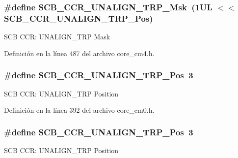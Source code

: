 \subsubsection[{\texorpdfstring{S\+C\+B\+\_\+\+C\+C\+R\+\_\+\+U\+N\+A\+L\+I\+G\+N\+\_\+\+T\+R\+P\+\_\+\+Msk}{SCB_CCR_UNALIGN_TRP_Msk}}]{\setlength{\rightskip}{0pt plus 5cm}\#define S\+C\+B\+\_\+\+C\+C\+R\+\_\+\+U\+N\+A\+L\+I\+G\+N\+\_\+\+T\+R\+P\+\_\+\+Msk~(1\+U\+L $<$$<$ S\+C\+B\+\_\+\+C\+C\+R\+\_\+\+U\+N\+A\+L\+I\+G\+N\+\_\+\+T\+R\+P\+\_\+\+Pos)}\hypertarget{group___c_m_s_i_s___s_c_b_ga68c96ad594af70c007923979085c99e0}{}\label{group___c_m_s_i_s___s_c_b_ga68c96ad594af70c007923979085c99e0}
S\+CB C\+CR\+: U\+N\+A\+L\+I\+G\+N\+\_\+\+T\+RP Mask 

Definición en la línea 487 del archivo core\+\_\+cm4.\+h.

\subsubsection[{\texorpdfstring{S\+C\+B\+\_\+\+C\+C\+R\+\_\+\+U\+N\+A\+L\+I\+G\+N\+\_\+\+T\+R\+P\+\_\+\+Pos}{SCB_CCR_UNALIGN_TRP_Pos}}]{\setlength{\rightskip}{0pt plus 5cm}\#define S\+C\+B\+\_\+\+C\+C\+R\+\_\+\+U\+N\+A\+L\+I\+G\+N\+\_\+\+T\+R\+P\+\_\+\+Pos~3}\hypertarget{group___c_m_s_i_s___s_c_b_gac4e4928b864ea10fc24dbbc57d976229}{}\label{group___c_m_s_i_s___s_c_b_gac4e4928b864ea10fc24dbbc57d976229}
S\+CB C\+CR\+: U\+N\+A\+L\+I\+G\+N\+\_\+\+T\+RP Position 

Definición en la línea 392 del archivo core\+\_\+cm0.\+h.

\subsubsection[{\texorpdfstring{S\+C\+B\+\_\+\+C\+C\+R\+\_\+\+U\+N\+A\+L\+I\+G\+N\+\_\+\+T\+R\+P\+\_\+\+Pos}{SCB_CCR_UNALIGN_TRP_Pos}}]{\setlength{\rightskip}{0pt plus 5cm}\#define S\+C\+B\+\_\+\+C\+C\+R\+\_\+\+U\+N\+A\+L\+I\+G\+N\+\_\+\+T\+R\+P\+\_\+\+Pos~3}\hypertarget{group___c_m_s_i_s___s_c_b_gac4e4928b864ea10fc24dbbc57d976229}{}\label{group___c_m_s_i_s___s_c_b_gac4e4928b864ea10fc24dbbc57d976229}
S\+CB C\+CR\+: U\+N\+A\+L\+I\+G\+N\+\_\+\+T\+RP Position 

